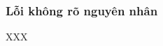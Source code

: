 \documentclass[a4paper,oneside,14pt]{extbook} %
\begin{document}
\subsubsection{Lỗi không rõ nguyên nhân}
XXX


\end{document}
